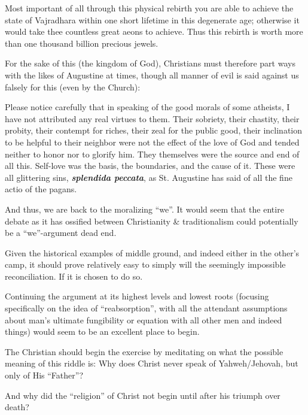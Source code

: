 \begin{quotex}
Most important of all through this physical rebirth you are able to achieve the state of Vajradhara within one short lifetime in this degenerate age; otherwise it would take thee countless great aeons to achieve. Thus this rebirth is worth more than one thousand billion precious jewels.
\end{quotex}


For the sake of this (the kingdom of God), Christians must therefore part ways with the likes of Augustine at times, though all manner of evil is said against us falsely for this (even by the Church):

\begin{quotex}
Please notice carefully that in speaking of the good morals of some atheists, I have not attributed any real virtues to them. Their sobriety, their chastity, their probity, their contempt for riches, their zeal for the public good, their inclination to be helpful to their neighbor were not the effect of the love of God and tended neither to honor nor to glorify him. They themselves were the source and end of all this. Self-love was the basis, the boundaries, and the cause of it. These were all glittering sins, \emph{\textbf{splendida peccata}}, as St. Augustine has said of all the fine actio of the pagans.
\end{quotex}


And thus, we are back to the moralizing ``we''. It would seem that the entire debate as it has ossified between Christianity \& traditionalism could potentially be a ``we''-argument dead end.

Given the historical examples of middle ground, and indeed either in the other's camp, it should prove relatively easy to simply will the seemingly impossible reconciliation. If it is chosen to do so.

Continuing the argument at its highest levels and lowest roots (focusing specifically on the idea of ``reabsorption'', with all the attendant assumptions about man's ultimate fungibility or equation with all other men and indeed things) would seem to be an excellent place to begin.

The Christian should begin the exercise by meditating on what the possible meaning of this riddle is: Why does Christ never speak of Yahweh/Jehovah, but only of His ``Father''?

And why did the ``religion'' of Christ not begin until after his triumph over death?

